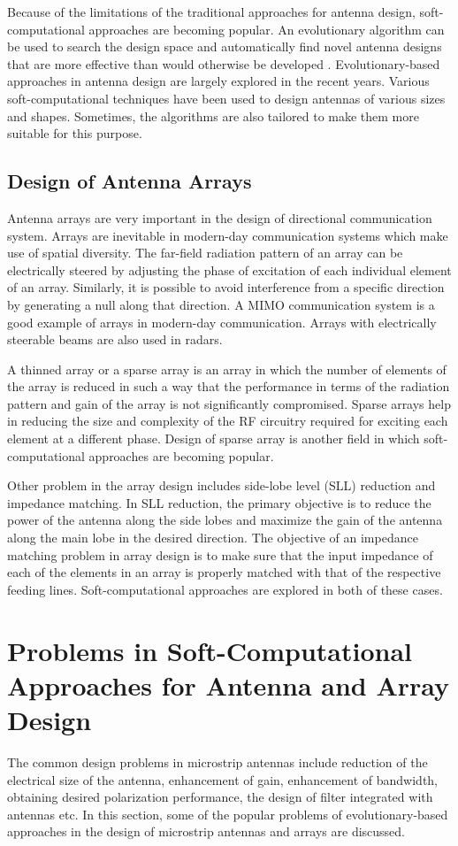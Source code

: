 Because of the limitations of the traditional approaches for antenna design, soft-computational approaches are becoming popular. An evolutionary algorithm can be used to search the design space and automatically find novel antenna designs that are more effective than would otherwise be developed \cite{cadNASA}. Evolutionary-based approaches in antenna design are largely explored in the recent years. Various soft-computational techniques have been used to design antennas of various sizes and shapes. Sometimes, the algorithms are also tailored to make them more suitable for this purpose.

\subsection{Design of Antenna Arrays}
Antenna arrays are very important in the design of directional communication system. Arrays are inevitable in modern-day communication systems which make use of spatial diversity. The far-field radiation pattern of an array can be electrically steered by adjusting the phase of excitation of each individual element of an array. Similarly, it is possible to avoid interference from a specific direction by generating a null along that direction. A MIMO communication system is a good example of arrays in modern-day communication. Arrays with electrically steerable beams are also used in radars.

A thinned array or a sparse array is an array in which the number of elements of the array is reduced in such a way that the performance in terms of the radiation pattern and gain of the array is not significantly compromised. Sparse arrays help in reducing the size and complexity of the RF circuitry required for exciting each element at a different phase. Design of sparse array is another field in which soft-computational approaches are becoming popular.

Other problem in the array design includes side-lobe level (SLL) reduction and impedance matching. In SLL reduction, the primary objective is to reduce the power of the antenna along the side lobes and maximize the gain of the antenna along the main lobe in the desired direction. The objective of an impedance matching problem in array design is to make sure that the input impedance of each of the elements in an array is properly matched with that of the respective feeding lines. Soft-computational approaches are explored in both of these cases.

\section{Problems in Soft-Computational Approaches for Antenna and Array Design} \label{c2sec_problems}
The common design problems in microstrip antennas include reduction of the electrical size of the antenna, enhancement of gain, enhancement of bandwidth, obtaining desired polarization performance, the design of filter integrated with antennas etc. In this section, some of the popular problems of evolutionary-based approaches in the design of microstrip antennas and arrays are discussed.
